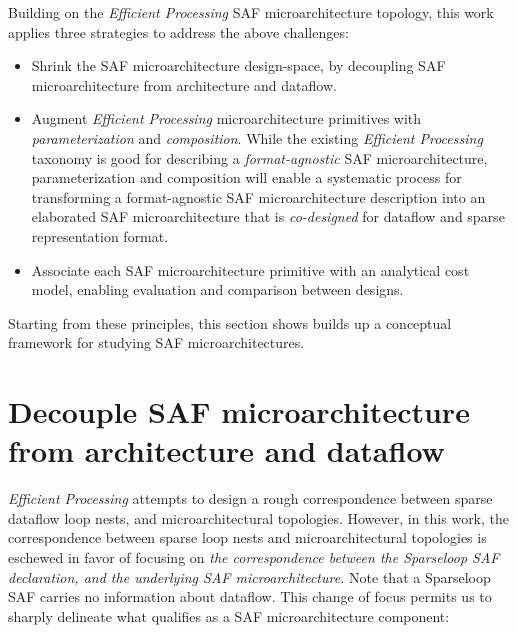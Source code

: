 Building on the \textit{Efficient Processing} SAF microarchitecture topology, this work applies three strategies to address the above challenges: 

\begin{itemize}
    \item Shrink the SAF microarchitecture design-space, by decoupling SAF microarchitecture from architecture and dataflow.
    \item Augment \textit{Efficient Processing} microarchitecture primitives with \textit{parameterization} and \textit{composition}. While the existing \textit{Efficient Processing} taxonomy is good for describing a \textit{format-agnostic} SAF microarchitecture, parameterization and composition will enable a systematic process for transforming a format-agnostic SAF microarchitecture description into an elaborated SAF microarchitecture that is \textit{co-designed} for dataflow and sparse representation format.
    \item Associate each SAF microarchitecture primitive with an analytical cost model, enabling evaluation and comparison between designs.
\end{itemize}



Starting from these principles, this section shows builds up a conceptual framework for studying SAF microarchitectures.

\section{Decouple SAF microarchitecture from architecture and dataflow}
\label{sec:what_is_a_saf_microarchitecture}

\textit{Efficient Processing} attempts to design a rough correspondence between sparse dataflow loop nests, and microarchitectural topologies\cite{szebook}. However, in this work, the correspondence between sparse loop nests and microarchitectural topologies is eschewed in favor of focusing on \textit{the correspondence between the Sparseloop\cite{sparseloop} SAF declaration, and the underlying SAF microarchitecture.} Note that a Sparseloop SAF carries no information about dataflow. This change of focus permits us to sharply delineate what qualifies as a SAF microarchitecture component:

